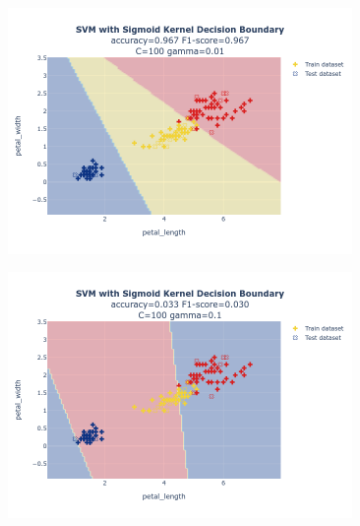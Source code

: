 \documentclass{article}
\begin{document}
\begin{figure}
\begin{subfigure}{0.3\textwidth}
        \includegraphics[scale=.13]{images/implementation/q1/sigmoid_kernel/petal_length_petal_width_100_0.01.png}
    \end{subfigure}
    \hfill
    \begin{subfigure}{0.3\textwidth}
        \centering
        \includegraphics[scale=.13]{images/implementation/q1/sigmoid_kernel/petal_length_petal_width_100_0.1.png}
    \end{subfigure}
    \newline
    \begin{subfigure}{0.3\textwidth}
        \centering

\end{subfigure}
\end{figure}
\end{document}
